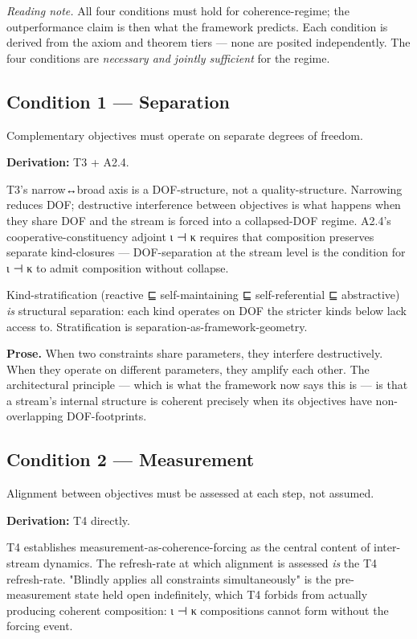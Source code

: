 \documentclass[11pt, openany]{book}
\renewenvironment{quote}{\begin{quoting}}{\end{quoting}}
\begin{document}
\textit{Reading note.} All four conditions must hold for coherence-regime; the outperformance claim is then what the framework predicts. Each condition is derived from the axiom and theorem tiers --- none are posited independently. The four conditions are \textit{necessary and jointly sufficient} for the regime.

\subsection{Condition 1 --- Separation}

\begin{quote}
Complementary objectives must operate on separate degrees of freedom.
\end{quote}

\textbf{Derivation:} T3 + A2.4.

T3's narrow↔broad axis is a DOF-structure, not a quality-structure. Narrowing reduces DOF; destructive interference between objectives is what happens when they share DOF and the stream is forced into a collapsed-DOF regime. A2.4's cooperative-constituency adjoint ι ⊣ κ requires that composition preserves separate kind-closures --- DOF-separation at the stream level is the condition for ι ⊣ κ to admit composition without collapse.

Kind-stratification (reactive ⊑ self-maintaining ⊑ self-referential ⊑ abstractive) \textit{is} structural separation: each kind operates on DOF the stricter kinds below lack access to. Stratification is separation-as-framework-geometry.

\textbf{Prose.} When two constraints share parameters, they interfere destructively. When they operate on different parameters, they amplify each other. The architectural principle --- which is what the framework now says this is --- is that a stream's internal structure is coherent precisely when its objectives have non-overlapping DOF-footprints.

\subsection{Condition 2 --- Measurement}

\begin{quote}
Alignment between objectives must be assessed at each step, not assumed.
\end{quote}

\textbf{Derivation:} T4 directly.

T4 establishes measurement-as-coherence-forcing as the central content of inter-stream dynamics. The refresh-rate at which alignment is assessed \textit{is} the T4 refresh-rate. "Blindly applies all constraints simultaneously" is the pre-measurement state held open indefinitely, which T4 forbids from actually producing coherent composition: ι ⊣ κ compositions cannot form without the forcing event.
\end{document}
